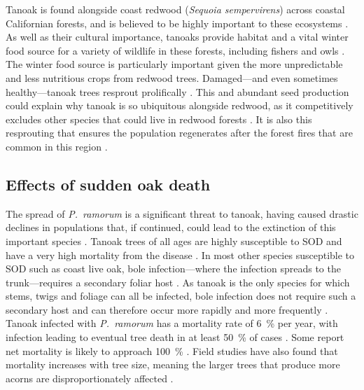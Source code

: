 Tanoak is found alongside coast redwood (\textit{Sequoia sempervirens}) across coastal Californian forests, and is believed to be highly important to these ecosystems \citep{noss_redwood_2000}. As well as their cultural importance, tanoaks provide habitat and a vital winter food source for a variety of wildlife in these forests, including fishers and owls \citep{long_recent_2018}. The winter food source is particularly important given the more unpredictable and less nutritious crops from redwood trees. Damaged---and even sometimes healthy---tanoak trees resprout prolifically \citep{tappeiner_lithocarpus_1990}. This and abundant seed production could explain why tanoak is so ubiquitous alongside redwood, as it competitively excludes other species that could live in redwood forests \citep{ramage_forest_2011}. It is also this resprouting that ensures the population regenerates after the forest fires that are common in this region \citep{mcdonald_california_2002, ramage_role_2010}.

\subsection{Effects of sudden oak death}

The spread of \textit{P.~ramorum} is a significant threat to tanoak, having caused drastic declines in populations that, if continued, could lead to the extinction of this important species \citep{mcpherson_responses_2010}. Tanoak trees of all ages are highly susceptible to SOD and have a very high mortality from the disease \citep{davis_preimpact_2010}. In most other species susceptible to SOD such as coast live oak, bole infection---where the infection spreads to the trunk---requires a secondary foliar host \citep{rizzo_phytophthora_2005}. As tanoak is the only species for which stems, twigs and foliage can all be infected, bole infection does not require such a secondary host and can therefore occur more rapidly and more frequently \citep{rizzo_sudden_2003}. Tanoak infected with \textit{P.~ramorum} has a mortality rate of \SI{6}{\percent} per year, with infection leading to eventual tree death in at least \SI{50}{\percent} of cases \citep{mcpherson_responses_2010}. Some report net mortality is likely to approach \SI{100}{\percent} \citep{ramage_sudden_2010}. Field studies have also found that mortality increases with tree size, meaning the larger trees that produce more acorns are disproportionately affected \citep{cobb_ecosystem_2012}.

